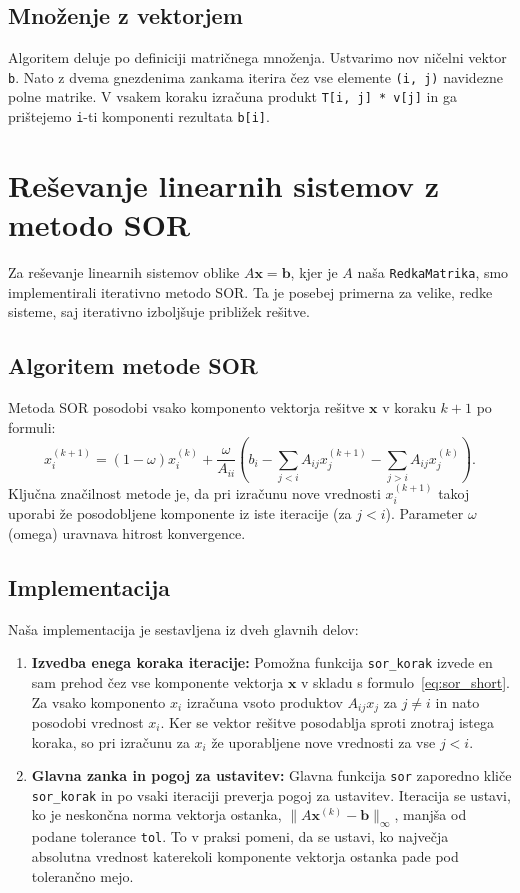 \documentclass{article}
\begin{document}
\subsection{Množenje z vektorjem}
Algoritem deluje po definiciji matričnega množenja. Ustvarimo nov ničelni vektor \texttt{b}. 
Nato z dvema gnezdenima zankama iterira čez vse elemente \texttt{(i, j)} 
navidezne polne matrike. V vsakem koraku 
izračuna produkt \texttt{T[i, j] * v[j]} in ga prištejemo \texttt{i}-ti 
komponenti rezultata \texttt{b[i]}.


\section{Reševanje linearnih sistemov z metodo SOR}

Za reševanje linearnih sistemov oblike $A\boldsymbol{x} = \boldsymbol{b}$, 
kjer je $A$ naša \texttt{RedkaMatrika}, smo implementirali iterativno 
metodo SOR. Ta je posebej primerna za velike, redke sisteme, saj 
iterativno izboljšuje približek rešitve.

\subsection{Algoritem metode SOR}
Metoda SOR posodobi vsako komponento vektorja rešitve 
$\boldsymbol{x}$ v koraku $k+1$ po formuli:
\begin{equation}
x_i^{(k+1)} = (1 - \omega) x_i^{(k)} + \frac{\omega}{A_{ii}} 
\left( b_i - \sum_{j<i} A_{ij}x_j^{(k+1)} - \sum_{j>i} A_{ij}x_j^{(k)} \right).
\label{eq:sor_short}
\end{equation}
Ključna značilnost metode je, da pri izračunu nove vrednosti $x_i^{(k+1)}$ 
takoj uporabi že posodobljene komponente iz iste iteracije (za $j<i$). 
Parameter $\omega$ (omega) uravnava hitrost konvergence.

\subsection{Implementacija}
Naša implementacija je sestavljena iz dveh glavnih delov:
\begin{enumerate}
    \item \textbf{Izvedba enega koraka iteracije:} Pomožna funkcija 
    \texttt{sor\_korak} izvede en sam prehod čez vse komponente vektorja 
    $\boldsymbol{x}$ v skladu s formulo~\eqref{eq:sor_short}. Za vsako 
    komponento $x_i$ izračuna vsoto produktov $A_{ij}x_j$ za $j \neq i$ in 
    nato posodobi vrednost $x_i$. Ker se vektor rešitve posodablja sproti 
    znotraj istega koraka, so pri izračunu za $x_i$ že uporabljene nove 
    vrednosti za vse $j<i$.

    \item \textbf{Glavna zanka in pogoj za ustavitev:} Glavna funkcija 
    \texttt{sor} zaporedno kliče \texttt{sor\_korak} in po vsaki iteraciji 
    preverja pogoj za ustavitev. Iteracija se ustavi, ko je neskončna norma 
    vektorja ostanka, $\|A\boldsymbol{x}^{(k)} - \boldsymbol{b}\|_\infty$, 
    manjša od podane tolerance \texttt{tol}. To v praksi pomeni, da se ustavi, 
    ko največja absolutna vrednost katerekoli komponente vektorja ostanka pade 
    pod tolerančno mejo.
\end{enumerate}
\end{document}

